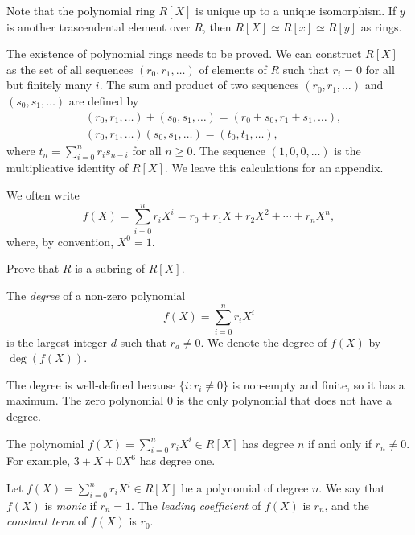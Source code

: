 \documentclass[12pt]{amsproc}
\begin{document}
Note that the polynomial ring $R[X]$ is unique up to a unique isomorphism. If $y$ is another trascendental element 
over $R$, then $R[X]\simeq R[x]\simeq R[y]$ as rings.

\begin{optional}
The existence of polynomial rings needs to be proved. We can construct $R[X]$ as the set of all sequences $(r_0,r_1,\dots)$ of elements of $R$ such that $r_i=0$ for all but finitely many $i$. The sum and product of two sequences $(r_0,r_1,\dots)$ and $(s_0,s_1,\dots)$ are defined by
\begin{align*}
&(r_0,r_1,\dots)+(s_0,s_1,\dots)=(r_0+s_0,r_1+s_1,\dots),\\
&(r_0,r_1,\dots)(s_0,s_1,\dots)=(t_0,t_1,\dots),
\end{align*}
where $t_n=\sum_{i=0}^n r_is_{n-i}$ for all $n\ge 0$. The sequence $(1,0,0,\dots)$ is the multiplicative identity of $R[X]$. 
We leave this calculations for an appendix.
\end{optional}

We often write 
\[
f(X)=\sum_{i=0}^n r_iX^i=r_0+r_1X+r_2X^2+\cdots+r_nX^n,
\]
where, by convention, $X^0=1$. 

\begin{exercise}
    \label{xca:subring}
    Prove that $R$ is a subring of $R[X]$.
\end{exercise}

\begin{definition}
    The \emph{degree} of a non-zero polynomial 
    \[
    f(X)=\sum_{i=0}^nr_iX^i
    \]
    is the largest integer $d$ such that $r_d\neq 0$. 
    We denote the degree of $f(X)$ by $\deg(f(X))$.
\end{definition}

The degree is well-defined because $\{ i : r_i\neq 0 \}$ is non-empty and finite, so it has a maximum.
The zero polynomial $0$ is the only polynomial that does not have a degree.

\begin{example}
    The polynomial $f(X)=\sum_{i=0}^n r_iX^i\in R[X]$ has degree $n$ if and only if $r_n\neq 0$. For example, 
    $3+X+0X^6$ has degree one. 
\end{example}

\begin{definition}
    Let $f(X)=\sum_{i=0}^n r_iX^i\in R[X]$ be a polynomial of degree $n$. 
    We say that $f(X)$ is \emph{monic} if $r_n=1$. The \emph{leading coefficient} of $f(X)$ is $r_n$, 
    and the \emph{constant term} of $f(X)$ is $r_0$.
\end{definition}
\end{document}
